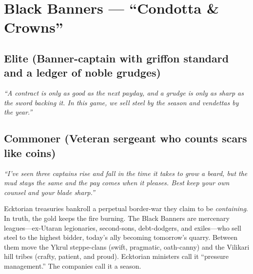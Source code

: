 \section{Black Banners --- ``Condotta \& Crowns''}
\label{chap:black-banners}

\subsection*{Elite (Banner-captain with griffon standard and a ledger of noble grudges)}
\textit{``A contract is only as good as the next payday, and a grudge is only as sharp as the sword backing it. In this game, we sell steel by the season and vendettas by the year.''}

\subsection*{Commoner (Veteran sergeant who counts scars like coins)}
\textit{``I've seen three captains rise and fall in the time it takes to grow a beard, but the mud stays the same and the pay comes when it pleases. Best keep your own counsel and your blade sharp.''}

\begin{tcolorbox}[colback=black!3,colframe=black!40!white,title={Condotta \& Crowns}]
Ecktorian treasuries bankroll a perpetual border-war they claim to be \emph{containing}. In truth, the gold keeps the fire burning. The Black Banners are mercenary leagues—ex-Utaran legionaries, second-sons, debt-dodgers, and exiles—who sell steel to the highest bidder, today's ally becoming tomorrow's quarry. Between them move the Ykrul steppe-clans (swift, pragmatic, oath-canny) and the Vilikari hill tribes (crafty, patient, and proud). Ecktorian ministers call it ``pressure management.'' The companies call it a season.
\end{tcolorbox}


